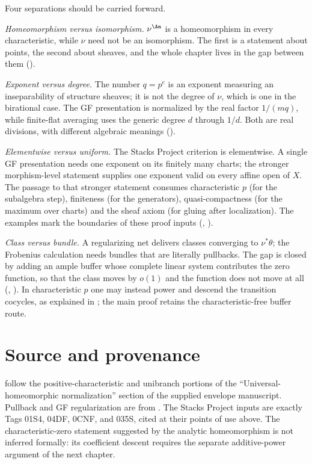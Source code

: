 Four separations should be carried forward.

\emph{Homeomorphism versus isomorphism.}  $\nu^{\An}$ is a homeomorphism
in every characteristic, while $\nu$ need not be an isomorphism.  The
first is a statement about points, the second about sheaves, and the whole
chapter lives in the gap between them
().

\emph{Exponent versus degree.}  The number $q=p^e$ is an exponent
measuring an inseparability of structure sheaves; it is not the degree of
$\nu$, which is one in the birational case.
The GF presentation is normalized by the real factor $1/(mq)$,
while finite-flat averaging uses the generic degree $d$ through $1/d$.
Both are real divisions, with different algebraic meanings
().

\emph{Elementwise versus uniform.}  The Stacks Project criterion is
elementwise.  A single GF presentation needs one exponent on its finitely
many charts; the stronger morphism-level statement supplies one exponent
valid on every affine open of $X$.  The passage to that stronger statement consumes
characteristic $p$ (for the subalgebra step), finiteness (for the
generators), quasi-compactness (for the maximum over charts) and the sheaf
axiom (for gluing after localization).  The examples mark the
boundaries of these proof inputs
(, ).

\emph{Class versus bundle.}  A regularizing net delivers classes converging
to $\nu^*\theta$; the Frobenius calculation needs bundles that are
literally pullbacks.  The gap is closed by adding an ample buffer whose
complete linear system contributes the zero function, so that the class
moves by $o(1)$ and the function does not move at all
(,
).  In characteristic $p$ one may
instead power and descend the transition cocycles, as explained in
; the main proof retains the
characteristic-free buffer route.

\section{Source and provenance}
\label{sec:ch43-source-note}

follow the positive-characteristic and unibranch portions of the
“Universal-homeomorphic normalization” section of the supplied envelope
manuscript.
Pullback and GF regularization are from \cite[Theorems~4.7 and~4.15]{BJ22}.
The Stacks Project inputs are exactly Tags 01S4, 04DF, 0CNF, and 035S, cited
at their points of use above.
The characteristic-zero statement suggested by the analytic homeomorphism is
not inferred formally:
its coefficient descent requires the separate additive-power argument of the
next chapter.

